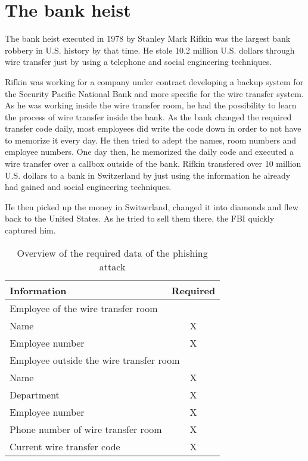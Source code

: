 \section{The bank heist}
\label{sec:bank_heist}

The bank heist executed in 1978 by Stanley Mark Rifkin was the largest bank
robbery in U.S. history by that time. He stole 10.2 million U.S. dollars
through wire transfer just by using a telephone and social engineering
techniques.

Rifkin was working for a company under contract developing a backup system for
the Security Pacific National Bank and more specific for the wire transfer
system. As he was working inside the wire transfer room, he had the possibility
to learn the process of wire transfer inside the bank. As the bank changed the
required transfer code daily, most employees did write the code down in order
to not have to memorize it every day. He then tried to adept the names, room
numbers and employee numbers. One day then, he memorized the daily code and
executed a wire transfer over a callbox outside of the bank. Rifkin transfered
over 10 million U.S. dollars to a bank in Switzerland by just using the
information he already had gained and social engineering techniques.

He then picked up the money in Switzerland, changed it into diamonds and flew
back to the United States. As he tried to sell them there, the FBI quickly
captured him.

\begin{table*}[ht]
  \centering
  \begin{tabular}{p{}c}
    \toprule
    Information & Required\\
    \midrule
    \multicolumn{2}{l}{Employee of the wire transfer room}\\
    \hspace{0.5cm} Name & X\\
    \hspace{0.5cm} Employee number & X\\
    \multicolumn{2}{l}{Employee outside the wire transfer room}\\
    \hspace{0.5cm} Name & X\\
    \hspace{0.5cm} Department & X\\
    \hspace{0.5cm} Employee number & X\\
    Phone number of wire transfer room & X\\
    Current wire transfer code & X\\
    \bottomrule
  \end{tabular}
  \caption{Overview of the required data of the phishing attack}
\end{table*}
